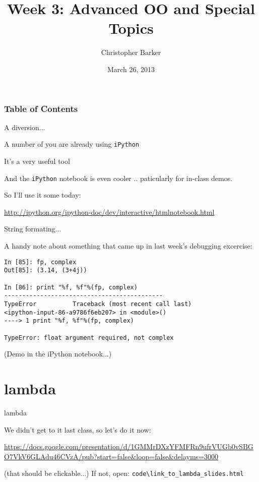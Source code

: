 \documentclass{beamer}
\title[Python Certificate: System Development]{Week 3: Advanced OO and Special Topics}
\author{Christopher Barker}
\institute{UW Continuing Education}
\date{March 26, 2013}
\begin{document}
\begin{frame}
  \titlepage
\end{frame}

\begin{frame}
\frametitle{Table of Contents}
  \tableofcontents
\end{frame}


\begin{frame}[fragile]{A diversion...}

\Large{A number of you are already using \verb|iPython|}

\vfill
\Large{It's a very useful tool}

\vfill
\Large{And the \verb|iPython| notebook is even cooler .. paticularly for in-class demos.}

\vfill
\Large{So I'll use it some today:}

\vfill
\url{http://ipython.org/ipython-doc/dev/interactive/htmlnotebook.html}


\end{frame}

\begin{frame}[fragile]{String formating...}

\Large{A handy note about something that came up in last week's debugging excercise:}

\vfill
\small{
\begin{verbatim}
In [85]: fp, complex
Out[85]: (3.14, (3+4j))

In [86]: print "%f, %f"%(fp, complex)
--------------------------------------------
TypeError          Traceback (most recent call last)
<ipython-input-86-a9786f6eb207> in <module>()
----> 1 print "%f, %f"%(fp, complex)

TypeError: float argument required, not complex

\end{verbatim}
}

\vfill
\large{(Demo in the iPython notebook...)}

\end{frame}


\section{lambda}

\begin{frame}[fragile]{lambda}

\vfill
\Large{We didn't get to it last class, so let's do it now:}

\vfill
\url{https://docs.google.com/presentation/d/1GMMrDXzYFMFRn9ufrVUGb0vSBGO7VkV6GLAdu46CVzA/pub?start=false&loop=false&delayms=3000}

(that should be clickable...)
\vfill
If not, open: \verb'code\link_to_lambda_slides.html'

\end{frame}
\end{document}
